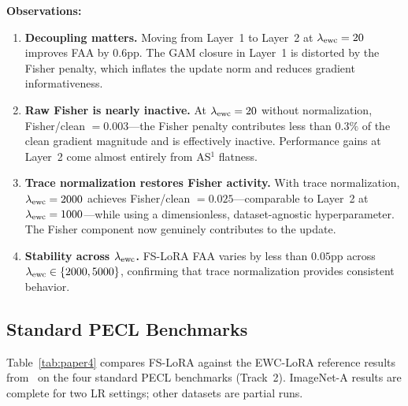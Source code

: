 \textbf{Observations:}
\begin{enumerate}
  \item \textbf{Decoupling matters.}
    Moving from Layer~1 to Layer~2 at $\lambda_{\mathrm{ewc}}=20$ improves FAA by $0.6$pp.
    The GAM closure in Layer~1 is distorted by the Fisher penalty,
    which inflates the update norm and reduces gradient informativeness.
  \item \textbf{Raw Fisher is nearly inactive.}
    At $\lambda_{\mathrm{ewc}}=20$ without normalization, Fisher/clean $=0.003$---the Fisher penalty
    contributes less than $0.3\%$ of the clean gradient magnitude and is effectively inactive.
    Performance gains at Layer~2 come almost entirely from AS$^1$ flatness.
  \item \textbf{Trace normalization restores Fisher activity.}
    With trace normalization, $\lambda_{\mathrm{ewc}}=2000$ achieves Fisher/clean $=0.025$---comparable
    to Layer~2 at $\lambda_{\mathrm{ewc}}=1000$---while using a dimensionless, dataset-agnostic hyperparameter.
    The Fisher component now genuinely contributes to the update.
  \item \textbf{Stability across $\lambda_{\mathrm{ewc}}$.}
    FS-LoRA FAA varies by less than $0.05$pp across $\lambda_{\mathrm{ewc}}\in\{2000,5000\}$,
    confirming that trace normalization provides consistent behavior.
\end{enumerate}

\subsection{Standard PECL Benchmarks}
\label{sec:paper4}

Table~\ref{tab:paper4} compares FS-LoRA against the EWC-LoRA reference results
from~\citet{zheng2025ewclora} on the four standard PECL benchmarks (Track~2).
ImageNet-A results are complete for two LR settings; other datasets are partial runs.

